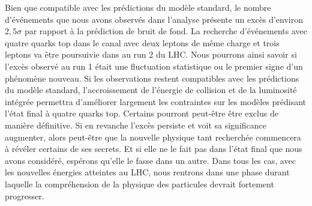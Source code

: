 Bien que compatible avec les pr\'edictions du mod\`ele standard, le nombre d'\'ev\'enements que nous avons observ\'es dans l'analyse pr\'esente un exc\`es d'environ $2,5\sigma$ par rapport \`a la pr\'ediction de bruit de fond.  %
La recherche d'\'ev\'enements avec quatre quarks top dans le canal avec deux leptons de m\^eme charge et trois leptons va \^etre poursuivie dans \ATLAS{} au run 2 du LHC. 
Nous pourrons ainsi savoir si l'exc\`es observ\'e au run 1 \'etait une fluctuation statistique ou le premier signe d'un ph\'enom\`ene nouveau.
Si les observations restent compatibles avec les pr\'edictions du mod\`ele standard, l'accroissement de l'\'energie de collision et de la luminosit\'e int\'egr\'ee permettra d'am\'eliorer largement les contraintes sur les mod\`eles pr\'edisant l'\'etat final \`a quatre quarks top. 
Certains pourront peut-\^etre \^etre exclus de mani\`ere d\'efinitive.
Si en revanche l'exc\`es persiste et voit sa significance augmenter, alors peut-\^etre que la nouvelle physique tant recherch\'ee commencera \`a r\'ev\'eler certains de ses secrets. 
Et si elle ne le fait pas dans l'\'etat final que nous avons consid\'er\'e, esp\'erons qu'elle le fasse dans un autre.  
Dans tous les cas, avec les nouvelles \'energies atteintes au LHC, nous rentrons dans une phase durant laquelle la compr\'ehension de la physique des particules devrait fortement progresser.


